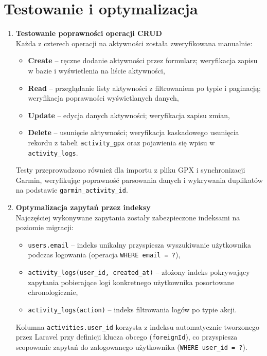 \documentclass[12pt,a4paper]{report}
\begin{document}
\section{Testowanie i optymalizacja}

\begin{enumerate}[resume]

\item \textbf{Testowanie poprawności operacji CRUD} \\
Każda z czterech operacji na aktywności została zweryfikowana manualnie:
\begin{itemize}[noitemsep]
    \item \textbf{Create} -- ręczne dodanie aktywności przez formularz; weryfikacja zapisu w bazie i wyświetlenia na liście aktywności,
    \item \textbf{Read} -- przeglądanie listy aktywności z filtrowaniem po typie i paginacją; weryfikacja poprawności wyświetlanych danych,
    \item \textbf{Update} -- edycja danych aktywności; weryfikacja zapisu zmian,
    \item \textbf{Delete} -- usunięcie aktywności; weryfikacja kaskadowego usunięcia rekordu z tabeli \texttt{activity\_gpx} oraz pojawienia się wpisu w \texttt{activity\_logs}.
\end{itemize}
Testy przeprowadzono również dla importu z pliku GPX i synchronizacji Garmin, weryfikując poprawność parsowania danych i wykrywania duplikatów na podstawie \texttt{garmin\_activity\_id}.

\item \textbf{Optymalizacja zapytań przez indeksy} \\
Najczęściej wykonywane zapytania zostały zabezpieczone indeksami na poziomie migracji:
\begin{itemize}[noitemsep]
    \item \texttt{users.email} -- indeks unikalny przyspiesza wyszukiwanie użytkownika podczas logowania (operacja \texttt{WHERE email = ?}),
    \item \texttt{activity\_logs(user\_id, created\_at)} -- złożony indeks pokrywający zapytania pobierające logi konkretnego użytkownika posortowane chronologicznie,
    \item \texttt{activity\_logs(action)} -- indeks filtrowania logów po typie akcji.
\end{itemize}
Kolumna \texttt{activities.user\_id} korzysta z indeksu automatycznie tworzonego przez Laravel przy definicji klucza obcego (\texttt{foreignId}), co przyspiesza scopowanie zapytań do zalogowanego użytkownika (\texttt{WHERE user\_id = ?}).


\end{enumerate}
\end{document}

